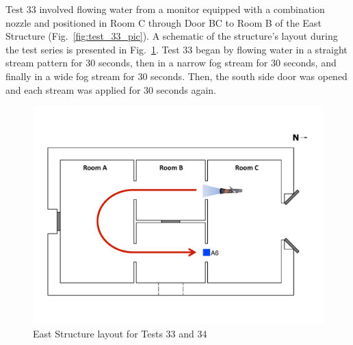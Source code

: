 \documentclass[12pt,oneside]{book}
\begin{document}
Test 33 involved flowing water from a monitor equipped with a combination nozzle and positioned in Room C through Door BC to Room B of the East Structure (Fig.~\ref{fig:test_33_pic}). A schematic of the structure's layout during the test series is presented in Fig.~\ref{fig:east_setup}. Test 33 began by flowing water in a straight stream pattern for 30 seconds, then in a narrow fog stream for 30 seconds, and finally in a wide fog stream for 30 seconds. Then, the south side door was opened and each stream was applied for 30 seconds again.

\begin{figure}[!ht]
\includegraphics[width=6in]{../Drawings/Specific_Tests/East_Hose_Test_Annotated}
\caption[East Structure Layout for Tests 33 and 34]{East Structure layout for Tests 33 and 34}
\label{fig:east_setup}
\end{figure}
\FloatBarrier
\end{document}
